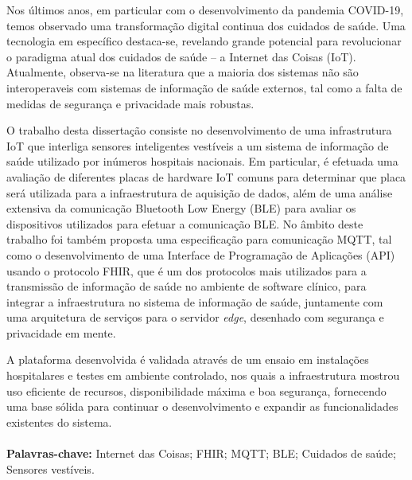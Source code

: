 \vspace{1cm}
\noindent

Nos últimos anos, em particular com o desenvolvimento da pandemia COVID-19, temos observado uma transformação digital continua dos cuidados de saúde. Uma tecnologia em específico destaca-se, revelando grande potencial para revolucionar o paradigma atual dos cuidados de saúde -- a Internet das Coisas (\acs{IoT}).
Atualmente, observa-se na literatura que a maioria dos sistemas não são interoperaveis com sistemas de informação de saúde externos, tal como a falta de medidas de segurança e privacidade mais robustas.

O trabalho desta dissertação consiste no desenvolvimento de uma infrastrutura \acs{IoT} que interliga sensores inteligentes vestíveis a um sistema de informação de saúde utilizado por inúmeros hospitais nacionais. 
Em particular, é efetuada uma avaliação de diferentes placas de hardware \acs{IoT} comuns para determinar que placa será utilizada para a infraestrutura de aquisição de dados, além de uma análise extensiva da comunicação Bluetooth Low Energy (\acs{BLE}) para avaliar os dispositivos utilizados para efetuar a comunicação \acs{BLE}.
No âmbito deste trabalho foi também proposta uma especificação para comunicação \acf{MQTT}, tal como o desenvolvimento de uma Interface de Programação de Aplicações (\acs{API}) usando o protocolo \acf{FHIR}, que é um dos protocolos mais utilizados para a transmissão de informação de saúde no ambiente de software clínico, para integrar a infraestrutura no sistema de informação de saúde, juntamente com uma arquitetura de serviços para o servidor \textit{edge}, desenhado com segurança e privacidade em mente.

A plataforma desenvolvida é validada através de um ensaio em instalações hospitalares e testes em ambiente controlado, nos quais a infraestrutura mostrou uso eficiente de recursos, disponibilidade máxima e boa segurança, fornecendo uma base sólida para continuar o desenvolvimento e expandir as funcionalidades existentes do sistema.

\paragraph{}\textbf{Palavras-chave:} Internet das Coisas; \acs{FHIR}; \acs{MQTT}; \acl{BLE}; Cuidados de saúde; Sensores vestíveis.
